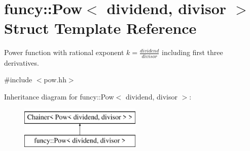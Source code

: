 \hypertarget{structfuncy_1_1Pow}{\section{funcy\-:\-:Pow$<$ dividend, divisor $>$ Struct Template Reference}
\label{structfuncy_1_1Pow}
}


Power function with rational exponent $ k = \frac{dividend}{divisor} $ including first three derivatives.  




{\ttfamily \#include $<$pow.\-hh$>$}

Inheritance diagram for funcy\-:\-:Pow$<$ dividend, divisor $>$\-:\begin{figure}[H]
\begin{center}
\leavevmode
\includegraphics[height=2.000000cm]{structfuncy_1_1Pow}
\end{center}
\end{figure}
